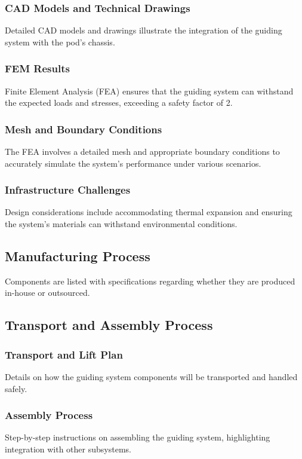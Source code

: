 \subsubsection{CAD Models and Technical Drawings}
Detailed CAD models and drawings illustrate the integration of the guiding system with the pod's chassis.

\subsubsection{FEM Results}
Finite Element Analysis (FEA) ensures that the guiding system can withstand the expected loads and stresses, exceeding a safety factor of 2.

\subsubsection{Mesh and Boundary Conditions}
The FEA involves a detailed mesh and appropriate boundary conditions to accurately simulate the system's performance under various scenarios.

\subsubsection{Infrastructure Challenges}
Design considerations include accommodating thermal expansion and ensuring the system's materials can withstand environmental conditions.

\subsection{Manufacturing Process}
Components are listed with specifications regarding whether they are produced in-house or outsourced.

\subsection{Transport and Assembly Process}
\subsubsection{Transport and Lift Plan}
Details on how the guiding system components will be transported and handled safely.

\subsubsection{Assembly Process}
Step-by-step instructions on assembling the guiding system, highlighting integration with other subsystems.


